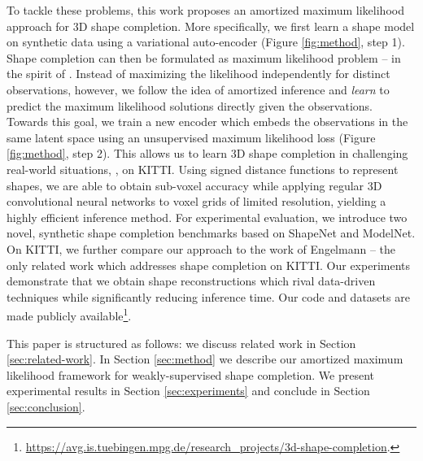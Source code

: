 %
%
To tackle these problems, this work proposes an amortized maximum likelihood approach for 3D shape completion.
More specifically, we first learn a shape model on synthetic data using a variational auto-encoder \cite{Kingma2013ARXIV} (\cf Figure \ref{fig:method}, step 1). Shape completion can then be formulated as maximum likelihood problem -- in the spirit of \cite{Engelmann2016GCPR}.
Instead of maximizing the likelihood independently for distinct observations, however, we follow the idea of amortized inference \cite{Gersham2014COGSCI} and \emph{learn} to predict the maximum likelihood solutions directly given the observations.
Towards this goal, we train a new encoder which embeds the observations in the same latent space using an unsupervised maximum likelihood loss (\cf Figure \ref{fig:method}, step 2). This allows us to learn 3D shape completion in challenging real-world situations, \eg, on KITTI.
Using signed distance functions to represent shapes, we are able to obtain sub-voxel accuracy while applying regular 3D convolutional neural networks to voxel grids of limited resolution, yielding a highly efficient inference method.
For experimental evaluation, we introduce two novel, synthetic shape completion benchmarks based on ShapeNet and ModelNet. On KITTI, we further compare our approach to the work of Engelmann \etal \cite{Engelmann2016GCPR} -- the only related work which addresses shape completion on KITTI.
Our experiments demonstrate that we obtain shape reconstructions which rival data-driven techniques while significantly reducing inference time.
Our code and datasets are made publicly available\footnote{\url{https://avg.is.tuebingen.mpg.de/research_projects/3d-shape-completion}.}.

This paper is structured as follows: we discuss related work in Section \ref{sec:related-work}. In Section \ref{sec:method} we describe our amortized maximum likelihood framework for weakly-supervised shape completion. We present experimental results in Section \ref{sec:experiments} and conclude in Section \ref{sec:conclusion}.
